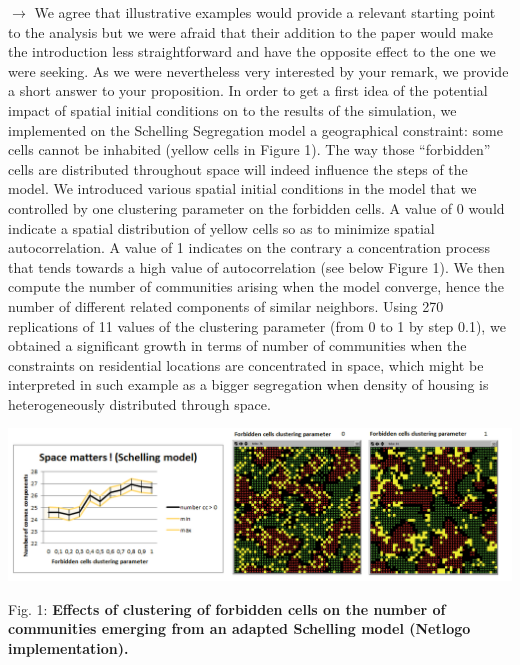 \documentclass[11pt,a4paper,sans]{moderncv}        %
\begin{document}
\begin{enumerate}
   $\rightarrow$ We agree that illustrative examples would provide a relevant starting point to  the analysis but we were afraid that their addition to the paper would make the introduction less straightforward and have the opposite effect to the one we were seeking. As we were nevertheless very interested by your remark, we provide a short answer to your proposition. In order to get a first idea of the potential impact of spatial initial conditions on to the results of the simulation, we implemented on the Schelling Segregation model a geographical constraint: some cells cannot be inhabited (yellow cells in Figure 1). The way those “forbidden” cells are distributed throughout space will indeed influence the steps of the model. We introduced various spatial initial conditions in the model that we controlled by one clustering parameter on the forbidden cells. A value of 0 would indicate a spatial distribution of yellow cells so as to minimize spatial autocorrelation. A value of 1 indicates on the contrary a concentration process that tends towards a high value of autocorrelation (see below Figure 1). We then compute the number of communities arising when the model converge, hence the number of different related components of similar neighbors. Using 270 replications of 11 values of the clustering parameter (from 0 to 1 by step 0.1), we obtained a significant growth in terms of number of communities when the constraints on residential locations are concentrated in space, which might be interpreted in such example as a bigger segregation when density of housing is heterogeneously distributed through space. 

\begin{minipage}{\textwidth}
\bigskip\bigskip
\begin{center} 
	\includegraphics[width=\textwidth]{figures/SpaceMatters2.png}

Fig. 1: \textbf{Effects of clustering of forbidden cells on the number of communities emerging from an adapted Schelling model (Netlogo implementation).}
\end{center}
\bigskip\bigskip
\end{minipage}
    

\end{enumerate}
\end{document}
